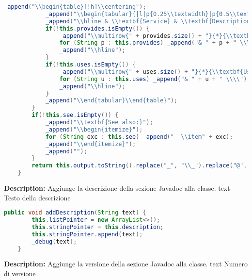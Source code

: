 \documentclass{article}
\makeatletter
\newcommand\atsign{@}
\makeatother
\begin{document}
\begin{lstlisting}[language=Java]
            _append("\\begin{table}[!h]\\centering");
            _append("\\begin{tabular}{|l|p{0.25\\textwidth}|p{0.5\\textwidth}|}");
            _append("\\hline & \\textbf{Service} & \\textbf{Description} \\\\ \\hline");
            if(!this.provides.isEmpty()) {
                _append("\\multirow{" + provides.size() + "}{*}{\\textbf{Provides}}");
                for (String p : this.provides) _append("& " + p + " \\\\");
                _append("\\hline");
            }
            if(!this.uses.isEmpty()) {
                _append("\\multirow{" + uses.size() + "}{*}{\\textbf{Uses}}");
                for (String u : this.uses) _append("& " + u + " \\\\");
                _append("\\hline");
            }
            _append("\\end{tabular}\\end{table}");
        }
        if(!this.see.isEmpty()) {
            _append("\\textbf{See also:}");
            _append("\\begin{itemize}");
            for (String exc : this.see) _append("  \\item" + exc);
            _append("\\end{itemize}");
            _append("");
        }
        return this.output.toString().replace("_", "\\_").replace("@", "\\atsign ");
    }
\end{lstlisting}
\textbf{Description:}  Aggiunge la descrizione della sezione Javadoc alla classe. text Testo della descrizione

\begin{lstlisting}[language=Java]
    public void addDescription(String text) {
        this.listPointer = new ArrayList<>();
        this.stringPointer = this.description;
        this.stringPointer.append(text);
        _debug(text);
    }
\end{lstlisting}
\textbf{Description:}  Aggiunge la versione della sezione Javadoc alla classe. text Numero di versione
\end{document}
